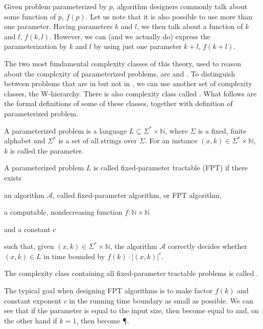 Given problem parameterized by $p$, algorithm designers commonly talk about some function of $p$, $f(p)$.
Let us note that it is also possible to use more than one parameter.
Having parameters $k$ and $l$, we then talk about a function of $k$ and $l$, $f(k,l)$.
However, we can (and we actually do) express the parameterization by $k$ and $l$ by using just one parameter $k+l$, $f(k+l)$.

The two most fundamental complexity classes of this theory, used to reason about the complexity of parameterized problems,
are \FPT and \XP.
To distinguish between \NPh problems that are in \XP but not in \FPT, we can use another set of complexity classes, the W-hierarchy.
There is also complexity class called \pNP.
What follows are the formal definitions of some of these classes, together with definition of parameterized problem.   

\begin{definition}
    A parameterized problem is a language $L \subseteq \Sigma^* \times \mathbb{N}$, where
    $\Sigma$ is a fixed, finite alphabet and $\Sigma^*$ is a set of all strings over $\Sigma$.
    For an instance $(x, k) \in \Sigma^* \times \mathbb{N}$, $k$ is called the parameter.
\end{definition}

\begin{definition}[FPT]
    A parameterized problem $L$ is called fixed-parameter tractable (FPT) if there exists
    \begin{description}
        \item an algorithm $\mathcal{A}$, called fixed-parameter algorithm, or FPT algorithm,
        \item a computable, nondecreasing function $f : \mathbb{N} \times \mathbb{N}$
        \item and a constant $c$
    \end{description}
    such that, given $(x,k) \in \Sigma^* \times \mathbb{N}$,
    the algorithm $\mathcal{A}$ correctly decides whether $(x, k) \in L$ in time bounded by
    $f(k) \cdot |(x,k)|^c$.
\end{definition}
The complexity class containing all fixed-parameter tractable problems is called \FPT.

The typical goal when designing FPT algorithms is to make factor $f(k)$ and constant exponent $c$
in the running time boundary as small as possible.
We can see that if the parameter is equal to the input size, then \FPT become equal to \NP and,
on the other hand if $k = 1$, then \FPT become \P \cite{Koutensky2020}.

